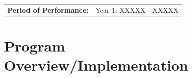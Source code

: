 \documentclass[12pt]{article}
\begin{document}
\begin{titlepage}
\begin{tabular}{ L{50mm} L{100mm} }
 \vspace{-24mm}    \normalsize \textbf{Period of Performance:} &  \vspace{-24mm} \normalsize Year 1: XXXXX - XXXXX \\

\end{tabular}



 \end{titlepage}

\cfoot{\thepage}
\setcounter{tocdepth}{1} %

\cfoot{} %




\renewcommand\contentsname{Table of Contents}

\setcounter{tocdepth}{5} %
\tableofcontents
\listoffigures
\listoftables
\newpage

\setcounter{page}{1}







\section{Program Overview/Implementation}
\end{document}
